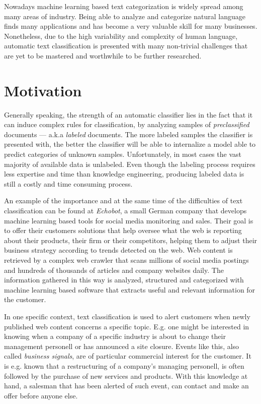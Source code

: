 Nowadays machine learning based text categorization is widely spread among many
areas of industry. Being able to analyze and categorize natural language
finds many applications and has become a very valuable skill for many
businesses. Nonetheless, due to the high variability and complexity of human
language, automatic text classification is presented with many non-trivial challenges 
that are yet to be mastered and worthwhile to be further researched. 

\section{Motivation}
\label{sec:Motivation}
Generally speaking, the strength of an automatic classifier lies in the fact
that it can induce complex rules for classification, by analyzing samples of
\textit{preclassified} documents --- a.k.a \textit{labeled} documents. 
The more labeled samples the classifier is presented with, the
better the classifier will be able to internalize a model able to predict
categories of unknown samples.
Unfortunately, in most cases the vast majority of available data
is unlabeled. Even though the labeling process requires less expertise and
time than knowledge engineering, producing labeled data is still a costly and
time consuming process.

An example of the importance and at the same time of the difficulties of text
classification can be found at \textit{Echobot}, a small
German company that develops machine learning based tools for social media
monitoring and sales. Their goal is to offer their customers solutions that
help oversee what the web is reporting about their products, their firm or
their competitors, helping them to adjust their business strategy according 
to trends detected on the web. Web content is retrieved by a complex web crawler
that scans millions of social media postings and hundreds of thousands
of articles and company websites daily. The information gathered in this way is
analyzed, structured and categorized with machine learning based software that
extracts useful and relevant information for the customer.

In one specific context, text classification is used to alert customers when
newly published web content concerns a specific topic. E.g. one might
be interested in knowing when a company of a specific industry is about to change
their management personell or has announced a site closure. 
Events like this, also called \textit{business signals}, are of particular
commercial interest for the customer. It is e.g. known that a restructuring 
of a company's managing personell, is often followed by the purchase of new
services and products. With this knowledge at hand, a salesman that has been
alerted of such event, can contact and make an offer before anyone else.

